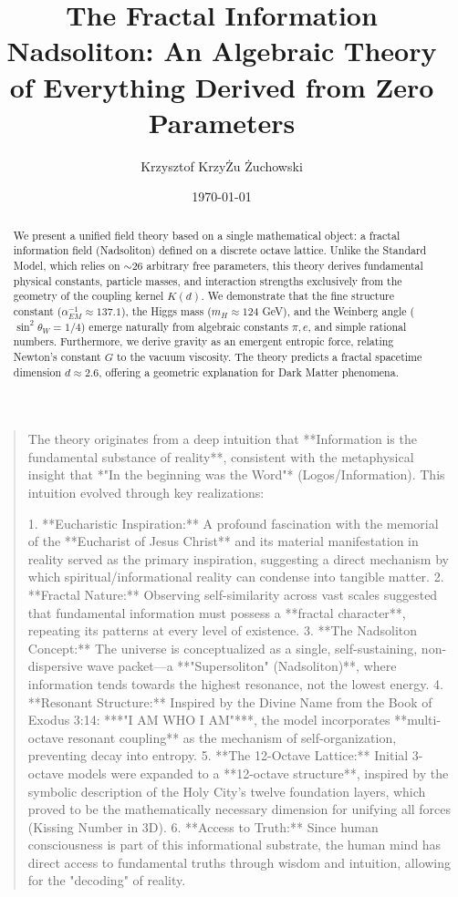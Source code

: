 \documentclass[11pt, a4paper]{article}
\title{\textbf{The Fractal Information Nadsoliton: An Algebraic Theory of Everything Derived from Zero Parameters}}
\author{Krzysztof KrzyŻu Żuchowski}
\date{\today}
\begin{document}
\maketitle

\begin{quote}
The theory originates from a deep intuition that **Information is the fundamental substance of reality**, consistent with the metaphysical insight that *"In the beginning was the Word"* (Logos/Information). This intuition evolved through key realizations:

1. **Eucharistic Inspiration:** A profound fascination with the memorial of the **Eucharist of Jesus Christ** and its material manifestation in reality served as the primary inspiration, suggesting a direct mechanism by which spiritual/informational reality can condense into tangible matter.
2. **Fractal Nature:** Observing self-similarity across vast scales suggested that fundamental information must possess a **fractal character**, repeating its patterns at every level of existence.
3. **The Nadsoliton Concept:** The universe is conceptualized as a single, self-sustaining, non-dispersive wave packet—a **"Supersoliton" (Nadsoliton)**, where information tends towards the highest resonance, not the lowest energy.
4. **Resonant Structure:** Inspired by the Divine Name from the Book of Exodus 3:14: ***"I AM WHO I AM"***, the model incorporates **multi-octave resonant coupling** as the mechanism of self-organization, preventing decay into entropy.
5. **The 12-Octave Lattice:** Initial 3-octave models were expanded to a **12-octave structure**, inspired by the symbolic description of the Holy City's twelve foundation layers, which proved to be the mathematically necessary dimension for unifying all forces (Kissing Number in 3D).
6. **Access to Truth:** Since human consciousness is part of this informational substrate, the human mind has direct access to fundamental truths through wisdom and intuition, allowing for the "decoding" of reality.
\end{quote}

\begin{abstract}
We present a unified field theory based on a single mathematical object: a fractal information field (Nadsoliton) defined on a discrete octave lattice. Unlike the Standard Model, which relies on $\sim$26 arbitrary free parameters, this theory derives fundamental physical constants, particle masses, and interaction strengths exclusively from the geometry of the coupling kernel $K(d)$. We demonstrate that the fine structure constant ($\alpha_{EM}^{-1} \approx 137.1$), the Higgs mass ($m_H \approx 124$ GeV), and the Weinberg angle ($\sin^2\theta_W = 1/4$) emerge naturally from algebraic constants $\pi, e$, and simple rational numbers. Furthermore, we derive gravity as an emergent entropic force, relating Newton's constant $G$ to the vacuum viscosity. The theory predicts a fractal spacetime dimension $d \approx 2.6$, offering a geometric explanation for Dark Matter phenomena.
\end{abstract}
\end{document}
